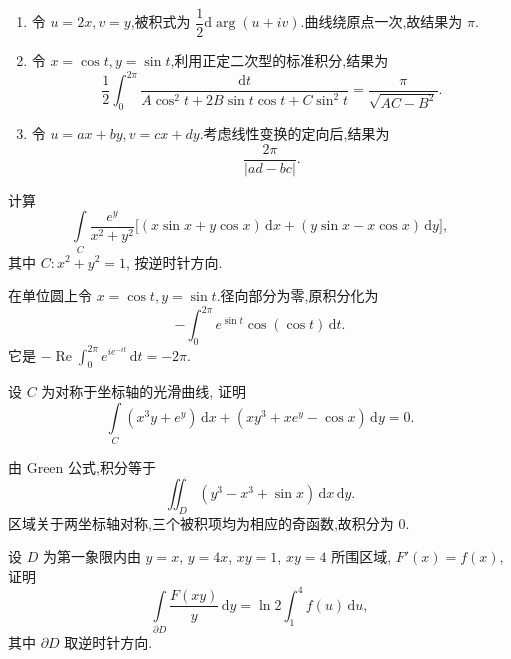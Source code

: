 \begin{solution}
    \begin{enumerate}
        \item 令 $u=2x,v=y$,被积式为 $\dfrac{1}{2}\mathrm{d}\arg(u+iv)$.曲线绕原点一次,故结果为 $\pi$.
        \item 令 $x=\cos t,y=\sin t$,利用正定二次型的标准积分,结果为
              \[
                  \dfrac{1}{2}\int_0^{2\pi}\dfrac{\mathrm{d}t}{A\cos^2t+2B\sin t\cos t+C\sin^2t}
                  =\dfrac{\pi}{\sqrt{AC-B^2}}.
              \]
        \item 令 $u=ax+by,v=cx+dy$.考虑线性变换的定向后,结果为
              \[
                  \dfrac{2\pi}{|ad-bc|}.
              \]
    \end{enumerate}
\end{solution}

\begin{example}
    计算
    \[
        \int\limits_C\dfrac{e^y}{x^2+y^2}
        \bigl\lbrack (x\sin x+y\cos x)\,\mathrm{d}x+(y\sin x-x\cos x)\,\mathrm{d}y\bigr\rbrack,
    \]
    其中 $C:x^2+y^2=1$, 按逆时针方向.
\end{example}
\exampleblank

\begin{solution}
    在单位圆上令 $x=\cos t,y=\sin t$.径向部分为零,原积分化为
    \[
        -\int_0^{2\pi}e^{\sin t}\cos(\cos t)\,\mathrm{d}t.
    \]
    它是 $-\operatorname{Re}\int_0^{2\pi}e^{i e^{-it}}\,\mathrm{d}t=-2\pi$.
\end{solution}

\begin{example}
    设 $C$ 为对称于坐标轴的光滑曲线, 证明
    \[
        \int\limits_C(x^3y+e^y)\,\mathrm{d}x+(xy^3+xe^y-\cos x)\,\mathrm{d}y=0.
    \]
\end{example}
\exampleblank

\begin{solution}
    由 Green 公式,积分等于
    \[
        \iint_D(y^3-x^3+\sin x)\,\mathrm{d}x\,\mathrm{d}y.
    \]
    区域关于两坐标轴对称,三个被积项均为相应的奇函数,故积分为 $0$.
\end{solution}

\begin{example}
    设 $D$ 为第一象限内由 $y=x$, $y=4x$, $xy=1$, $xy=4$ 所围区域, $F'(x)=f(x)$, 证明
    \[
        \int\limits_{\partial D}\dfrac{F(xy)}{y}\,\mathrm{d}y
        =\ln2\int_1^4f(u)\,\mathrm{d}u,
    \]
    其中 $\partial D$ 取逆时针方向.
\end{example}
\exampleblank

